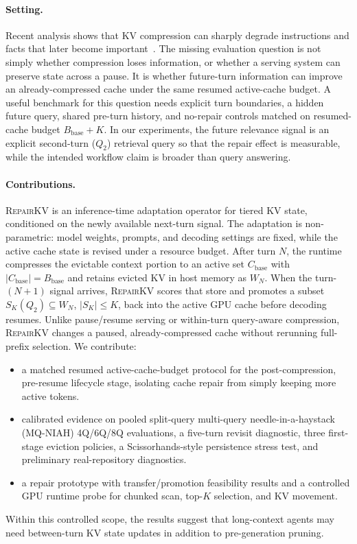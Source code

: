 \documentclass{article}
\newcommand{\repairkv}{\textsc{RepairKV}}
\newcommand{\bbase}{\ensuremath{B_{\mathrm{base}}}}
\begin{document}
\paragraph{Setting.}
Recent analysis shows that KV compression can sharply degrade
instructions and facts that later become important~\citep{pitfalls}.
The missing evaluation question is not simply whether compression loses
information, or whether a serving system can preserve state across a pause.
It is whether future-turn information can improve an already-compressed
cache under the same resumed active-cache budget.
A useful benchmark for this question needs explicit turn boundaries, a
hidden future query, shared pre-turn history, and no-repair controls matched
on resumed-cache budget $\bbase+K$.
In our experiments, the future relevance signal is an explicit second-turn
($Q_2$) retrieval query so that the repair effect is measurable, while the
intended workflow claim is broader than query answering.

\paragraph{Contributions.}
\repairkv{} is an inference-time adaptation operator for tiered KV state,
conditioned on the newly available next-turn signal.
The adaptation is non-parametric: model weights, prompts, and decoding
settings are fixed, while the active cache state is revised under a
resource budget.
After turn $N$, the runtime compresses the evictable context portion to
an active set $C_{\mathrm{base}}$ with $|C_{\mathrm{base}}|=\bbase$ and
retains evicted KV in host memory as $W_N$.
When the turn-$(N{+}1)$ signal arrives, \repairkv{} scores that store and
promotes a subset $S_K(Q_2)\subseteq W_N$, $|S_K|\le K$, back into the
active GPU cache before decoding resumes.
Unlike pause/resume serving or within-turn query-aware compression, \repairkv{}
changes a paused, already-compressed cache without rerunning full-prefix
selection.
We contribute:
\begin{itemize}[leftmargin=1.4em,noitemsep,topsep=2pt]
  \item a matched resumed active-cache-budget protocol for the
  post-compression, pre-resume lifecycle stage, isolating cache repair
  from simply keeping more active tokens.
  \item calibrated evidence on pooled split-query multi-query
  needle-in-a-haystack (MQ-NIAH) 4Q/6Q/8Q evaluations, a five-turn
  revisit diagnostic, three first-stage eviction policies, a
  Scissorhands-style persistence stress test, and preliminary
  real-repository diagnostics.
  \item a repair prototype with transfer/promotion feasibility
  results and a controlled GPU runtime probe for chunked scan, top-$K$
  selection, and KV movement.
\end{itemize}
Within this controlled scope, the results suggest that long-context agents may need
between-turn KV state updates in addition to pre-generation pruning. 
\end{document}
